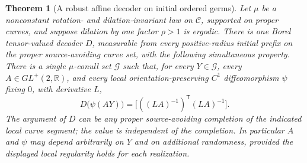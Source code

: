 \documentclass[11pt]{article}
\newtheorem{theorem}{Theorem}[section]
\theoremstyle{definition}\newtheorem{definition}[theorem]{Definition}
\theoremstyle{remark}\newtheorem{remark}[theorem]{Remark}
\newcommand{\RR}{\mathbb R}
\begin{document}
\begin{theorem}[A robust affine decoder on initial ordered germs]
\label{thm:wp-robust-decoder}
Let $\mu$ be a nonconstant rotation- and dilation-invariant law on
$\mathcal C$, supported on proper curves, and suppose dilation by
one factor $\rho>1$ is ergodic.  There is one Borel tensor-valued
decoder $D$, measurable from every positive-radius initial prefix
on the proper source-avoiding curve set, with the following
simultaneous property.  There is a single $\mu$-conull set
$\mathcal G$ such that, for every $Y\in\mathcal G$, every
$A\in GL^+(2,\RR)$, and every local orientation-preserving
$C^1$ diffeomorphism $\psi$ fixing $0$, with derivative $L$,
\[
 D\bigl(\psi(AY)\bigr)
    =\bigl[((LA)^{-1})^{\mathsf T}(LA)^{-1}\bigr].
 \tag{WP5}
\]
The argument of $D$ can be any proper source-avoiding completion
of the indicated local curve segment; the value is independent of
the completion.  In particular $A$ and $\psi$ may depend arbitrarily
on $Y$ and on additional randomness, provided the displayed local
regularity holds for each realization.
\end{theorem}
\end{document}
